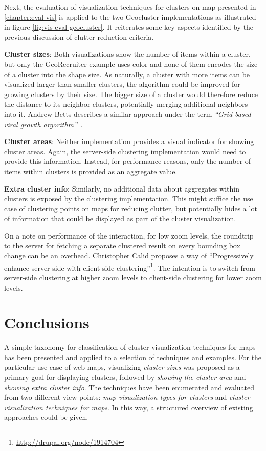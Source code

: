 Next, the evaluation of visualization techniques for clusters on map presented in \ref{chapter:eval-vis} is applied to the two Geocluster implementations as illustrated in figure \ref{fig:vis-eval-geocluster}. It reiterates some key aspects identified by the previous discussion of clutter reduction criteria.

\textbf{Cluster sizes}: Both visualizations show the number of items within a cluster, but only the GeoRecruiter example uses color and none of them encodes the size of a cluster into the shape size. As naturally, a cluster with more items can be visualized larger than smaller clusters, the algorithm could be improved for growing clusters by their size. The bigger size of a cluster would therefore reduce the distance to its neighbor clusters, potentially merging additional neighbors into it. Andrew Betts describes a similar approach under the term \textit{``Grid based viral growth argorithm''}~\cite{web:clustering-google}.

\textbf{Cluster areas}: Neither implementation provides a visual indicator for showing cluster areas. Again, the server-side clustering implementation would need to provide this information. Instead, for performance reasons, only the number of items within clusters is provided as an aggregate value.

\textbf{Extra cluster info}: Similarly, no additional data about aggregates within clusters is exposed by the clustering implementation. This might suffice the use case of clustering points on maps for reducing clutter, but potentially hides a lot of information that could be displayed as part of the cluster visualization. 

On a note on performance of the interaction, for low zoom levels, the roundtrip to the server for fetching a separate clustered result on every bounding box change can be an overhead. Christopher Calid proposes a way of ``Progressively enhance server-side with client-side clustering''\footnote{\url{http://drupal.org/node/1914704}}. The intention is to switch from server-side clustering at higher zoom levels to client-side clustering for lower zoom levels.



\section{Conclusions}

A simple taxonomy for classification of cluster visualization techniques for maps has been presented and applied to a selection of techniques and examples. For the particular use case of web maps, visualizing \textit{cluster sizes} was proposed as a primary goal for displaying clusters, followed by \textit{showing the cluster area} and \textit{showing extra cluster info}. The techniques have been enumerated and evaluated from two different view points: \textit{map visualization types for clusters} and \textit{cluster visualization techniques for maps}. In this way, a structured overview of existing approaches could be given.

